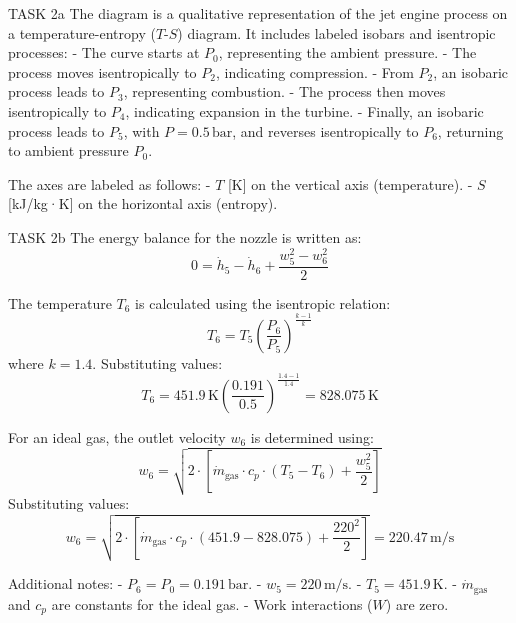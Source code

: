 TASK 2a  
The diagram is a qualitative representation of the jet engine process on a temperature-entropy (\( T \)-\( S \)) diagram. It includes labeled isobars and isentropic processes:  
- The curve starts at \( P_0 \), representing the ambient pressure.  
- The process moves isentropically to \( P_2 \), indicating compression.  
- From \( P_2 \), an isobaric process leads to \( P_3 \), representing combustion.  
- The process then moves isentropically to \( P_4 \), indicating expansion in the turbine.  
- Finally, an isobaric process leads to \( P_5 \), with \( P = 0.5 \, \text{bar} \), and reverses isentropically to \( P_6 \), returning to ambient pressure \( P_0 \).  

The axes are labeled as follows:  
- \( T \) [K] on the vertical axis (temperature).  
- \( S \) [kJ/kg·K] on the horizontal axis (entropy).  

TASK 2b  
The energy balance for the nozzle is written as:  
\[
0 = \dot{h}_5 - \dot{h}_6 + \frac{w_5^2 - w_6^2}{2}
\]  

The temperature \( T_6 \) is calculated using the isentropic relation:  
\[
T_6 = T_5 \left( \frac{P_6}{P_5} \right)^{\frac{k-1}{k}}
\]  
where \( k = 1.4 \). Substituting values:  
\[
T_6 = 451.9 \, \text{K} \left( \frac{0.191}{0.5} \right)^{\frac{1.4-1}{1.4}} = 828.075 \, \text{K}
\]  

For an ideal gas, the outlet velocity \( w_6 \) is determined using:  
\[
w_6 = \sqrt{2 \cdot \left[ \dot{m}_{\text{gas}} \cdot c_p \cdot (T_5 - T_6) + \frac{w_5^2}{2} \right]}
\]  
Substituting values:  
\[
w_6 = \sqrt{2 \cdot \left[ \dot{m}_{\text{gas}} \cdot c_p \cdot (451.9 - 828.075) + \frac{220^2}{2} \right]} = 220.47 \, \text{m/s}
\]  

Additional notes:  
- \( P_6 = P_0 = 0.191 \, \text{bar} \).  
- \( w_5 = 220 \, \text{m/s} \).  
- \( T_5 = 451.9 \, \text{K} \).  
- \( \dot{m}_{\text{gas}} \) and \( c_p \) are constants for the ideal gas.  
- Work interactions (\( W \)) are zero.